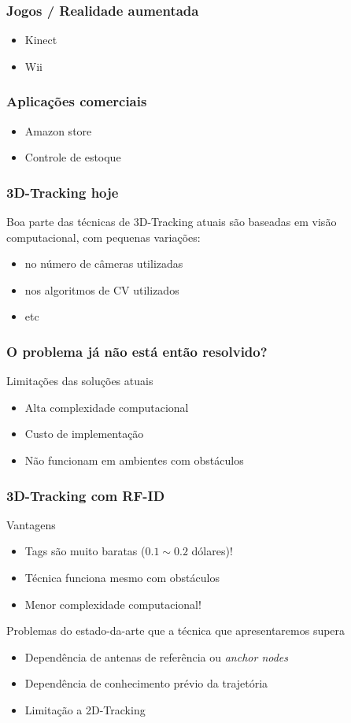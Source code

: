 \begin{frame}
  \frametitle{Jogos / Realidade aumentada}
  \begin{itemize}
    \item  Kinect
    \item  Wii
  \end{itemize}
\end{frame}

\begin{frame}
  \frametitle{Aplicações comerciais}
  \begin{itemize}
    \item  Amazon store
    \item  Controle de estoque
  \end{itemize}
\end{frame}

\begin{frame}
  \frametitle{3D-Tracking hoje}

  Boa parte das técnicas de 3D-Tracking atuais são baseadas em visão computacional, com pequenas variações:
  \begin{itemize}
    \item no número de câmeras utilizadas
    \item nos algoritmos de CV utilizados
    \item etc
  \end{itemize}
\end{frame}

\begin{frame}
  \frametitle{O problema já não está então resolvido?}

  Limitações das soluções atuais
  \begin{itemize}
    \item  Alta complexidade computacional
    \item  Custo de implementação
    \item  Não funcionam em ambientes com obstáculos
  \end{itemize}

\end{frame}


\begin{frame}
  \frametitle{3D-Tracking com RF-ID}

  Vantagens
  \begin{itemize}
    \item  Tags são muito baratas ($0.1 \sim 0.2$ dólares)!
    \item  Técnica funciona mesmo com obstáculos
    \item  Menor complexidade computacional!
  \end{itemize}

  Problemas do estado-da-arte que a técnica que apresentaremos supera
  \begin{itemize}
    \item  Dependência de antenas de referência ou \emph{anchor nodes} 
    \item  Dependência de conhecimento prévio da trajetória
    \item  Limitação a 2D-Tracking
  \end{itemize}
\end{frame}
